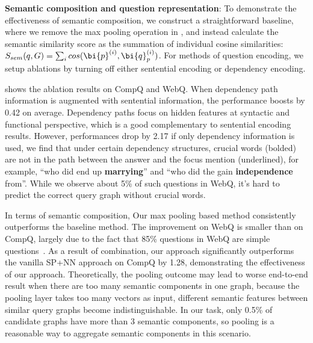 \textbf{Semantic composition and question representation}:
To demonstrate the effectiveness of semantic composition,
we construct a straightforward baseline,
where we remove the max pooling operation in ,
and instead calculate the semantic similarity score as 
the summation of individual cosine similarities:
$S_{sem}(q, G) = \sum_{i}{cos(\bi{p}^{(i)}, \bi{q}_p^{(i)})}$.
For methods of question encoding, we setup ablations 
by turning off either sentential encoding or dependency encoding.



 shows the ablation results on CompQ and WebQ.
When dependency path information is augmented with sentential information,
the performance boosts by 0.42 on average.
Dependency paths focus on hidden features at syntactic and functional perspective,
which is a good complementary to sentential encoding results.
However, performances drop by 2.17 if only dependency information is used,
we find that under certain dependency structures, 
crucial words (bolded) are not in the path between the answer and the focus mention (underlined),
for example, ``who did  end up \textbf{marrying}''
and ``who did the  gain \textbf{independence} from''.
While we observe about 5\% of such questions in WebQ,
it's hard to predict the correct query graph without crucial words.

In terms of semantic composition, 
Our max pooling based method consistently outperforms the baseline method.
The improvement on WebQ is smaller than on CompQ, 
largely due to the fact that 85\% questions in WebQ are simple questions~\cite{bao2016constraint}.
As a result of combination,
our approach significantly outperforms the vanilla SP+NN approach on CompQ by 1.28,
demonstrating the effectiveness of our approach.
Theoretically, the pooling outcome may lead to worse end-to-end result 
when there are too many semantic components in one graph,
because the pooling layer takes too many vectors as input,
different semantic features between similar query graphs become indistinguishable.
In our task, only 0.5\% of candidate graphs have more than 3 semantic components, 
so pooling is a reasonable way to aggregate semantic components in this scenario.

